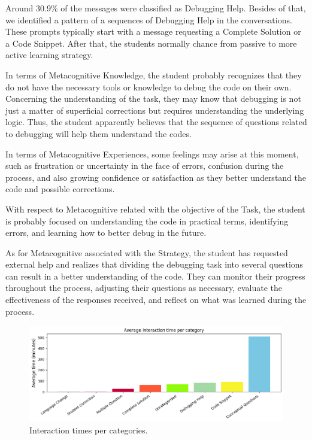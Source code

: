 \documentclass[a4paper,twoside]{article}
\begin{document}
Around 30.9\% of the messages were classified as Debugging Help. Besides of
that, we identified a pattern of a sequences of Debugging Help in the
conversations. These prompts typically start with a message requesting a
Complete Solution or a Code Snippet. After that, the students normally chance
from passive to more active learning strategy.

In terms of Metacognitive Knowledge, the student probably recognizes that they
do not have the necessary tools or knowledge to debug the code on their own.
Concerning the understanding of the task, they may know that debugging is not
just a matter of superficial corrections but requires understanding the
underlying logic. Thus, the student apparently believes that the sequence of
questions related to debugging will help them understand the codes.

In terms of Metacognitive Experiences, some feelings may arise at this moment,
such as frustration or uncertainty in the face of errors, confusion during the
process, and also growing confidence or satisfaction as they better understand
the code and possible corrections.

With respect to Metacognitive related with the objective of the Task, the
student is probably focused on understanding the code in practical terms,
identifying errors, and learning how to better debug in the future.

As for Metacognitive associated with the Strategy, the student has requested
external help and realizes that dividing the debugging task into several
questions can result in a better understanding of the code. They can monitor
their progress throughout the process, adjusting their questions as necessary,
evaluate the effectiveness of the responses received, and reflect on what was
learned during the process.

\begin{figure}[htbp]
  \centering
  \includegraphics[scale=0.55]{img/figure3.png}
  \caption{Interaction times per categories.}
  \label{fig:graph3}
\end{figure}
\end{document}
